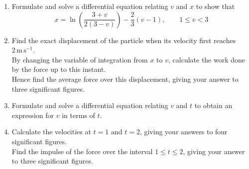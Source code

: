 \documentclass[leqno]{article}
\begin{document}
\begin{enumerate}[
  label=\textbf{\arabic*.},
  leftmargin=*,
  topsep=0pt,
  partopsep=0pt,
  parsep=0pt
]
\begin{enumerate}[label=\textbf{(\alph*)}]
  \item Formulate and solve a differential equation relating $v$ and $x$ to show that
  \[
  x=\ln\left(\frac{3+v}{2(3-v)}\right)-\frac{2}{3}(v-1),\qquad 1\leq v<3
  \] 
  \item Find the exact displacement of the particle when its velocity first reaches $2\,\mathrm{m\,s^{-1}}$. \\
  By changing the variable of integration from $x$ to $v$, calculate the work done by the force up to this instant. \\
  Hence find the average force over this displacement, giving your answer to three significant figures.  \\
  \item Formulate and solve a differential equation relating $v$ and $t$ to obtain an expression for $v$ in terms of $t$.  \\
  \item Calculate the velocities at $t=1$ and $t=2$, giving your answers to four significant figures. \\
  Find the impulse of the force over the interval $1\leq t\leq2$, giving your answer to three significant figures.  \\
\end{enumerate}

\end{enumerate}
\end{document}
